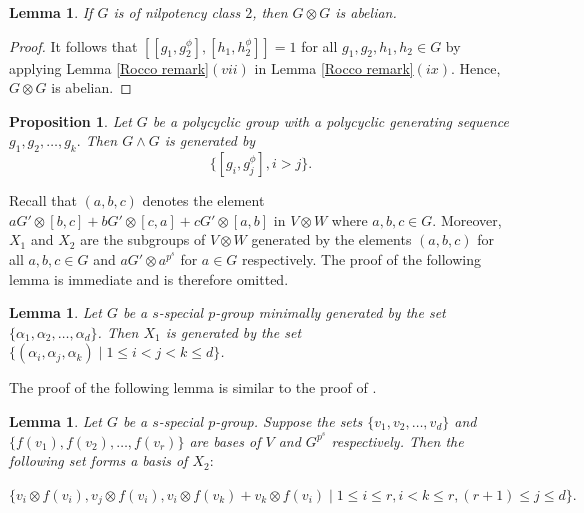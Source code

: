 \documentclass[preprint,sort&compress,12pt]{elsarticle}
\newtheorem{lemma}[theorem]{Lemma}
\newtheorem{proposition}[theorem]{Proposition}
\numberwithin{equation}{section}
\theoremstyle{definition}
\begin{document}
\begin{lemma}
    If $G$ is of nilpotency class $2$, then $G \otimes G$ is abelian.
\end{lemma}
\begin{proof}
It follows that ${[[g_1,g_2^\phi],[h_1,h_2^\phi]]=1}$ for all $g_1,g_2,h_1,h_2 \in G$ by applying Lemma \ref{Rocco remark}$(vii)$ in Lemma \ref{Rocco remark}$(ix)$. Hence, $G \otimes G$ is abelian.
\end{proof}

\begin{proposition} \cite[Proposition 20]{Blyth2009}\label{exterior-gen}
    Let $G$ be a polycyclic group with a polycyclic generating sequence $g_1,g_2,\ldots,g_k.$ Then $G \wedge G$ is generated by 
    $$\{[g_i,g_j^\phi],i >j\}.$$
\end{proposition}


Recall that $(a,b,c)$ denotes the element $aG' \otimes [b,c]+bG' \otimes [c,a] + cG' \otimes [a,b]$ in $V \otimes W$ where $a,b,c \in G$.
 Moreover, $X_1$ and $X_2$ are the subgroups of $V \otimes W$ generated by the elements $(a,b,c)$ for all $a,b,c \in G$ and $aG' \otimes a^{p^s}$ for $a \in G$ respectively. The proof of the following lemma is immediate and is therefore omitted.
\begin{lemma}
    Let $G$ be a $s$-special $p$-group minimally generated by the set $\{\alpha_1,\alpha_2,\ldots,\alpha_d\}$. Then $X_1$ is generated by the set
  $\{(\alpha_i,\alpha_j,\alpha_k) \mid 1 \le i <j<k\le d\}$.
\end{lemma}

The proof of the following lemma is similar to the proof of \cite[Proposition 3.3]{Rai2018}.

\begin{lemma} \label{basis$X_2$}
    Let $G$ be a $s$-special $p$-group. Suppose the sets $\{v_1,v_2,\ldots,v_d\}$ and $\{f(v_1),f(v_2),\ldots,f(v_r)\}$ are bases of $V$ and $G^{p^s}$ respectively. Then the following set forms a basis of $X_2:$
     
$\{v_i \otimes f(v_i),v_j\otimes f(v_i),v_i \otimes f(v_k)+v_k \otimes f(v_i)\mid 1 \le i \le r, i < k \le r, (r+1) \le j \le d \}.$
\end{lemma}
\end{document}
